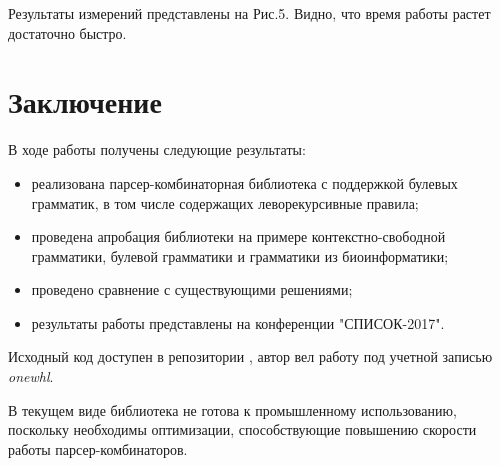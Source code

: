 \documentclass[14pt]{matmex-diploma}
\begin{document}
Результаты измерений представлены на Рис.5. Видно, что время работы растет достаточно быстро.

\section*{Заключение}
В ходе работы получены следующие результаты:
\begin{itemize}
    \item реализована парсер-комбинаторная библиотека с поддержкой булевых грамматик, в том числе содержащих леворекурсивные правила;
    \item проведена апробация библиотеки на примере контекстно-свободной грамматики, булевой грамматики и грамматики из биоинформатики;
    \item проведено сравнение с существующими решениями;
    \item результаты работы представлены на конференции "СПИСОК-2017".
\end{itemize}
Исходный код доступен в репозитории \cite{pc}, автор вел работу под учетной записью \textit{onewhl}.

В текущем виде библиотека не готова к промышленному использованию, поскольку необходимы оптимизации, способствующие повышению скорости работы парсер-комбинаторов.

\setmonofont[Mapping=tex-text]{CMU Typewriter Text}


\end{document}
